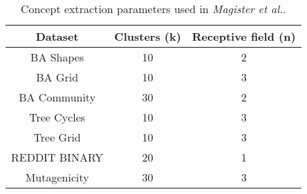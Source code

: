 \begin{table}
    \centering
    \begin{tabular}{c|cc}
        \textbf{Dataset} &
        \textbf{Clusters (k)} &
        \textbf{Receptive field (n)} \\
        \midrule
        BA Shapes       & 10 & 2 \\
        BA Grid         & 10 & 3 \\
        BA Community    & 30 & 2 \\
        Tree Cycles     & 10 & 3 \\
        Tree Grid       & 10 & 3 \\
        \midrule
        REDDIT BINARY   & 20 & 1 \\
        Mutagenicity    & 30 & 3 \\
    \end{tabular}
    \caption{Concept extraction parameters used in \textit{Magister et al.}\cite{magister2021gcexplainer}.}
    \label{tab:GCN-concept-params}
\end{table}

